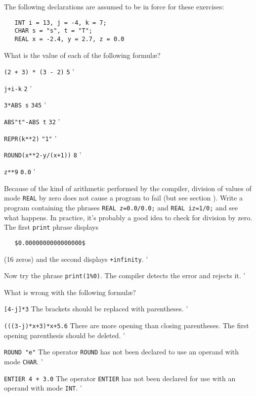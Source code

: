 \begin{exercise}
\item The following declarations are assumed to be in force for
these exercises:
\begin{verbatim}
   INT i = 13, j = -4, k = 7;
   CHAR s = "s", t = "T";
   REAL x = -2.4, y = 2.7, z = 0.0
\end{verbatim}
\noindent
What is the value of each of the following formul{\ae}?
\begin{subex}
\item \verb|(2 + 3) * (3 - 2)| \subans \verb|5|
'
\item \verb|j+i-k| \subans \verb|2|
'
\item \verb|3*ABS s| \subans \verb|345|
'
\item \verb|ABS"t"-ABS t| \subans \verb|32|
'
\item \verb|REPR(k**2)| \subans \verb|"1"|
'
\item \verb|ROUND(x**2-y/(x+1))| \subans \verb|8|
'
\item \verb|z**9| \subans \verb|0.0|
'
\end{subex}
\item Because of the kind of arithmetic performed by the compiler,
division of values of mode \verb|REAL| by zero does not cause a
program to fail (but see section ). Write a program
containing the phrases \verb|REAL z=0.0/0.0;| and \verb|REAL iz=1/0;|
and see what happens.  In practice, it's probably a good idea to
check for division by zero. \ans The first \verb|print| phrase
displays
\begin{verbatim}
   $0.0000000000000000$
\end{verbatim}
\noindent
(16 zeros) and the second displays \verb|+infinity|.
'
\item Now try the phrase \verb|print(1%0)|. \ans The compiler detects
the error and rejects it.
'
\item What is wrong with the following formul{\ae}?
\begin{subex}
\item \verb|[4-j]*3| \subans The brackets should be replaced with
parentheses.
'
\item \verb|(((3-j)*x+3)*x+5.6| \subans There are more opening than
closing parentheses. The first opening parenthesis should be deleted.
'
\item \verb|ROUND "e"| \subans The operator \verb|ROUND| has not been
declared to use an operand with mode \verb|CHAR|.
'
\item \verb|ENTIER 4 + 3.0| \subans The operator \verb|ENTIER| has
not been declared for use with an operand with mode \verb|INT|. 
'
\end{subex}
\end{exercise}
